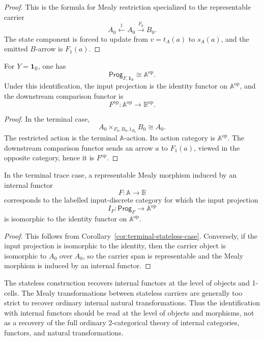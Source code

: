 \begin{proof}
This is the formula for Mealy restriction specialized to the representable
carrier
\[
A_0\xleftarrow{1}A_0\xrightarrow{F_0}B_0.
\]
The state component is forced to update from \(v=t_A(a)\) to \(s_A(a)\), and
the emitted \(B\)-arrow is \(F_1(a)\).
\end{proof}

\begin{corollary}
\label{cor:terminal-stateless-case}
For \(Y=\mathbf 1_{\mathbb B}\), one has
\[
\mathsf{Prog}_{F,\mathbf 1_{\mathbb B}}
\cong
\mathbb A^{\mathrm{op}}.
\]
Under this identification, the input projection is the identity functor on
\(\mathbb A^{\mathrm{op}}\), and the downstream comparison functor is
\[
F^{\mathrm{op}}:\mathbb A^{\mathrm{op}}\to\mathbb B^{\mathrm{op}}.
\]
\end{corollary}

\begin{proof}
In the terminal case,
\[
A_0\times_{F_0,B_0,1_{B_0}}B_0\cong A_0.
\]
The restricted action is the terminal \(\mathbb A\)-action. Its action category
is \(\mathbb A^{\mathrm{op}}\). The downstream comparison functor sends an
arrow \(a\) to \(F_1(a)\), viewed in the opposite category, hence it is
\(F^{\mathrm{op}}\).
\end{proof}

\begin{corollary}
\label{cor:representable-trivial-input-discrete}
In the terminal trace case, a representable Mealy morphism induced by an
internal functor
\[
F:\mathbb A\to\mathbb B
\]
corresponds to the labelled input-discrete category for which the input
projection
\[
I_F:\mathsf{Prog}_F\to\mathbb A^{\mathrm{op}}
\]
is isomorphic to the identity functor on \(\mathbb A^{\mathrm{op}}\).
\end{corollary}

\begin{proof}
This follows from Corollary~\ref{cor:terminal-stateless-case}. Conversely, if
the input projection is isomorphic to the identity, then the carrier object is
isomorphic to \(A_0\) over \(A_0\), so the carrier span is representable and
the Mealy morphism is induced by an internal functor.
\end{proof}

\begin{remark}
\label{rem:natural-transformations-caveat-relative}
The stateless construction recovers internal functors at the level of objects
and 1-cells. The Mealy transformations between stateless carriers are generally
too strict to recover ordinary internal natural transformations. Thus the
identification with internal functors should be read at the level of objects
and morphisms, not as a recovery of the full ordinary 2-categorical theory of
internal categories, functors, and natural transformations.
\end{remark}


